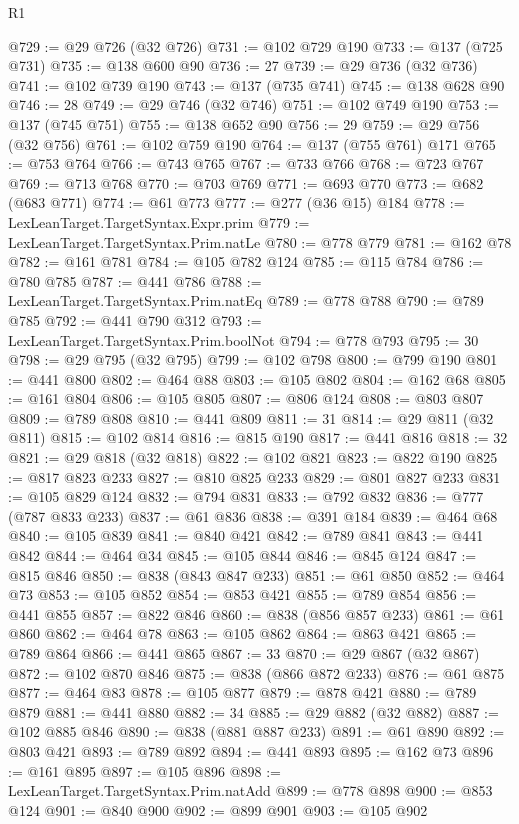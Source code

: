 \begin{lexlean}{R1}
\begin{coremodule}
@729 := @29 @726 (@32 @726)
@731 := @102 @729 @190
@733 := @137 (@725 @731)
@735 := @138 @600 @90
@736 := 27
@739 := @29 @736 (@32 @736)
@741 := @102 @739 @190
@743 := @137 (@735 @741)
@745 := @138 @628 @90
@746 := 28
@749 := @29 @746 (@32 @746)
@751 := @102 @749 @190
@753 := @137 (@745 @751)
@755 := @138 @652 @90
@756 := 29
@759 := @29 @756 (@32 @756)
@761 := @102 @759 @190
@764 := @137 (@755 @761) @171
@765 := @753 @764
@766 := @743 @765
@767 := @733 @766
@768 := @723 @767
@769 := @713 @768
@770 := @703 @769
@771 := @693 @770
@773 := @682 (@683 @771)
@774 := @61 @773
@777 := @277 (@36 @15) @184
@778 := LexLeanTarget.TargetSyntax.Expr.prim
@779 := LexLeanTarget.TargetSyntax.Prim.natLe
@780 := @778 @779
@781 := @162 @78
@782 := @161 @781
@784 := @105 @782 @124
@785 := @115 @784
@786 := @780 @785
@787 := @441 @786
@788 := LexLeanTarget.TargetSyntax.Prim.natEq
@789 := @778 @788
@790 := @789 @785
@792 := @441 @790 @312
@793 := LexLeanTarget.TargetSyntax.Prim.boolNot
@794 := @778 @793
@795 := 30
@798 := @29 @795 (@32 @795)
@799 := @102 @798
@800 := @799 @190
@801 := @441 @800
@802 := @464 @88
@803 := @105 @802
@804 := @162 @68
@805 := @161 @804
@806 := @105 @805
@807 := @806 @124
@808 := @803 @807
@809 := @789 @808
@810 := @441 @809
@811 := 31
@814 := @29 @811 (@32 @811)
@815 := @102 @814
@816 := @815 @190
@817 := @441 @816
@818 := 32
@821 := @29 @818 (@32 @818)
@822 := @102 @821
@823 := @822 @190
@825 := @817 @823 @233
@827 := @810 @825 @233
@829 := @801 @827 @233
@831 := @105 @829 @124
@832 := @794 @831
@833 := @792 @832
@836 := @777 (@787 @833 @233)
@837 := @61 @836
@838 := @391 @184
@839 := @464 @68
@840 := @105 @839
@841 := @840 @421
@842 := @789 @841
@843 := @441 @842
@844 := @464 @34
@845 := @105 @844
@846 := @845 @124
@847 := @815 @846
@850 := @838 (@843 @847 @233)
@851 := @61 @850
@852 := @464 @73
@853 := @105 @852
@854 := @853 @421
@855 := @789 @854
@856 := @441 @855
@857 := @822 @846
@860 := @838 (@856 @857 @233)
@861 := @61 @860
@862 := @464 @78
@863 := @105 @862
@864 := @863 @421
@865 := @789 @864
@866 := @441 @865
@867 := 33
@870 := @29 @867 (@32 @867)
@872 := @102 @870 @846
@875 := @838 (@866 @872 @233)
@876 := @61 @875
@877 := @464 @83
@878 := @105 @877
@879 := @878 @421
@880 := @789 @879
@881 := @441 @880
@882 := 34
@885 := @29 @882 (@32 @882)
@887 := @102 @885 @846
@890 := @838 (@881 @887 @233)
@891 := @61 @890
@892 := @803 @421
@893 := @789 @892
@894 := @441 @893
@895 := @162 @73
@896 := @161 @895
@897 := @105 @896
@898 := LexLeanTarget.TargetSyntax.Prim.natAdd
@899 := @778 @898
@900 := @853 @124
@901 := @840 @900
@902 := @899 @901
@903 := @105 @902

\end{coremodule}
\end{lexlean}
